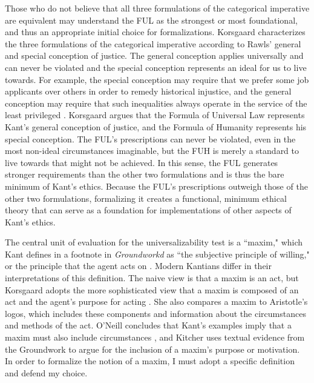 \begin{isabellebody}
\begin{isamarkuptext}
Those who do not believe that all three formulations of the categorical imperative are equivalent may
understand the FUL as the strongest or most foundational, and thus an appropriate initial choice for 
formalizations. Korsgaard characterizes the three formulations of the categorical
imperative according to Rawls' general and special conception of justice. The general conception applies
universally and can never be violated and the special conception represents an ideal for us to
live towards. For example, the special conception may require that we prefer some job applicants
over others in order to remedy historical injustice, and the general conception may require that such
inequalities always operate in the service of the least privileged \citep[19]{KorsgaardRTL}. Korsgaard
argues that the Formula of Universal Law represents Kant's general conception of justice, and the Formula of 
Humanity represents his special conception. The FUL's prescriptions can never be violated, even in the most
non-ideal circumstances imaginable, but the FUH is merely a standard to live towards that might not be 
achieved. In this sense, the FUL generates stronger requirements than the other two formulations and is 
thus the bare minimum of Kant's ethics. Because the FUL's prescriptions outweigh those of the other two formulations,
formalizing it creates a functional, minimum ethical theory that can serve as a foundation for implementations
of other aspects of Kant's ethics.%
\end{isamarkuptext}\isamarkuptrue%
%
\isadelimdocument
%
\endisadelimdocument
%
\isatagdocument
%
\isamarkuptrue%
%
\endisatagdocument
{\isafolddocument}%
%
\isadelimdocument
%
\endisadelimdocument
%
\begin{isamarkuptext}%
The central unit of evaluation for the universalizability test is a ``maxim," which Kant defines 
in a footnote in \emph{Groundworkd} as ``the subjective principle of willing," or the principle that 
the agent acts on \cite[16]{groundwork}. Modern Kantians differ in their interpretations of this definition. The naive view 
is that a maxim is an act, but Korsgaard adopts the more sophisticated view that a maxim is composed
of an act and the agent's purpose for acting \cite{actingforareason}. She also compares a maxim 
to Aristotle's logos, which includes these components and information about the circumstances and methods 
of the act. O'Neill concludes that Kant's examples imply that a maxim must also include circumstances \cite{actingonprinciple}, and 
Kitcher \cite{whatisamaxim} uses textual evidence from the Groundwork to argue for the inclusion of a maxim's purpose 
or motivation. In order to formalize the notion of a maxim, I must adopt a specific definition and 
defend my choice.


\end{isamarkuptext}
\end{isabellebody}

